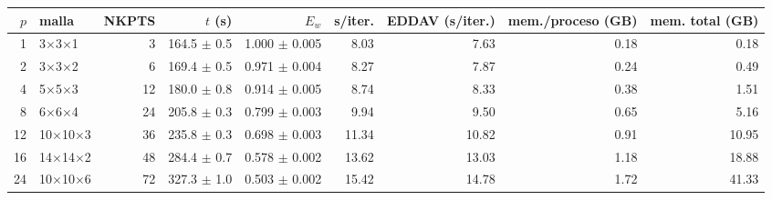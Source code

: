 \begin{tabular}{r l r r r r r r r}
\toprule
$p$ & malla & NKPTS & $t$ (s) & $E_w$ & s/iter. & EDDAV (s/iter.) & mem./proceso (GB) & mem. total (GB) \\
\midrule
1 & 3$\times$3$\times$1 & 3 & 164.5 $\pm$ 0.5 & 1.000 $\pm$ 0.005 & 8.03 & 7.63 & 0.18 & 0.18 \\
2 & 3$\times$3$\times$2 & 6 & 169.4 $\pm$ 0.5 & 0.971 $\pm$ 0.004 & 8.27 & 7.87 & 0.24 & 0.49 \\
4 & 5$\times$5$\times$3 & 12 & 180.0 $\pm$ 0.8 & 0.914 $\pm$ 0.005 & 8.74 & 8.33 & 0.38 & 1.51 \\
8 & 6$\times$6$\times$4 & 24 & 205.8 $\pm$ 0.3 & 0.799 $\pm$ 0.003 & 9.94 & 9.50 & 0.65 & 5.16 \\
12 & 10$\times$10$\times$3 & 36 & 235.8 $\pm$ 0.3 & 0.698 $\pm$ 0.003 & 11.34 & 10.82 & 0.91 & 10.95 \\
16 & 14$\times$14$\times$2 & 48 & 284.4 $\pm$ 0.7 & 0.578 $\pm$ 0.002 & 13.62 & 13.03 & 1.18 & 18.88 \\
24 & 10$\times$10$\times$6 & 72 & 327.3 $\pm$ 1.0 & 0.503 $\pm$ 0.002 & 15.42 & 14.78 & 1.72 & 41.33 \\
\bottomrule
\end{tabular}

